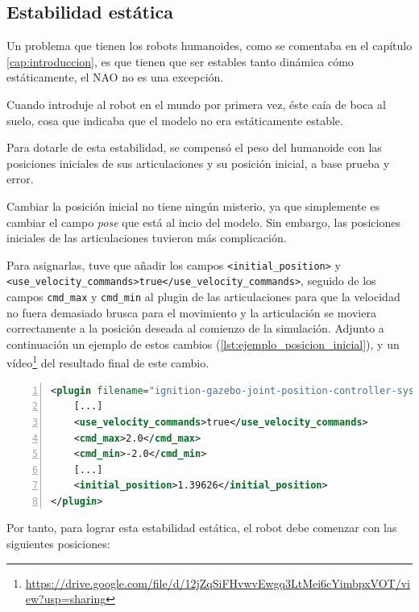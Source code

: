 \subsection{Estabilidad estática}

Un problema que tienen los robots humanoides, como se comentaba en el capítulo \ref{cap:introduccion}, es que tienen que ser estables tanto dinámica cómo estáticamente, el NAO no es una excepción.

Cuando introduje al robot en el mundo por primera vez, éste caía de boca al suelo, cosa que indicaba que el modelo no era estáticamente estable.

Para dotarle de esta estabilidad, se compensó el peso del humanoide con las posiciones iniciales de sus articulaciones y su posición inicial, a base prueba y error.

Cambiar la posición inicial no tiene ningún misterio, ya que simplemente es cambiar el campo \textit{pose} que está al incio del modelo. Sin embargo, las posiciones iniciales de las articulaciones tuvieron más complicación.

Para asignarlas, tuve que añadir los campos \texttt{<initial\_position>} y \texttt{<use\_velocity\_commands>true</use\_velocity\_commands>}, seguido de los campos \texttt{cmd\_max} y \texttt{cmd\_min} al plugin de las articulaciones para que la velocidad no fuera demasiado brusca para el movimiento y la articulación se moviera correctamente a la posición deseada al comienzo de la simulación. Adjunto a continuación un ejemplo de estos cambios (\autoref{lst:ejemplo_posicion_inicial}), y un vídeo\footnote{\url{https://drive.google.com/file/d/12jZqSiFHvwvEwgq3LtMei6cYimbpxVOT/view?usp=sharing}} del resultado final de este cambio.  

\begin{lstlisting}[language=XML, caption={Ejemplo de configuración de posición inicial de una articulación}, label={lst:ejemplo_posicion_inicial}, numbers=left, backgroundcolor=\color{gray!10}]    
<plugin filename="ignition-gazebo-joint-position-controller-system" name="ignition::gazebo::systems::JointPositionController">
    [...]
    <use_velocity_commands>true</use_velocity_commands>
    <cmd_max>2.0</cmd_max>
    <cmd_min>-2.0</cmd_min>
    [...]
    <initial_position>1.39626</initial_position>
</plugin>
\end{lstlisting}

Por tanto, para lograr esta estabilidad estática, el robot debe comenzar con las siguientes posiciones:

